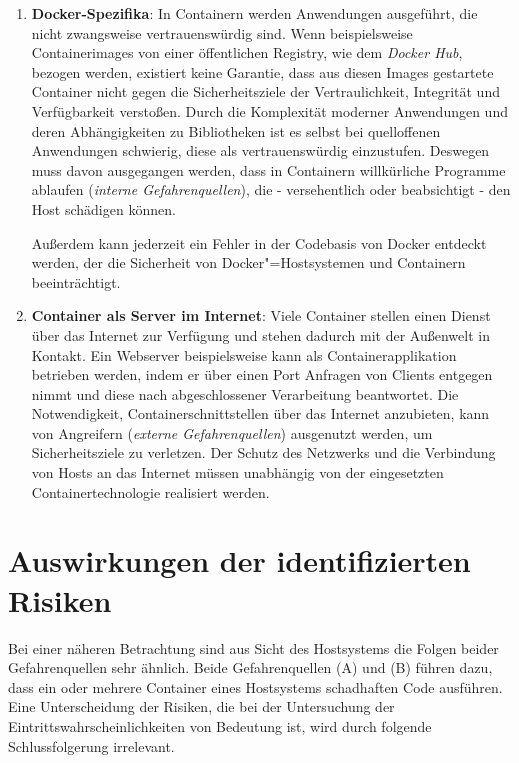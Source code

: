 \documentclass[../main.tex]{subfiles}
\begin{document}
    \begin{enumerate}[label=(\Alph*)]
      \item \textbf{Docker-Spezifika}: In Containern werden Anwendungen ausgeführt, die nicht zwangsweise vertrauenswürdig sind. Wenn beispielsweise Containerimages von einer öffentlichen Registry, wie dem \emph{Docker Hub}, bezogen werden, existiert keine Garantie, dass aus diesen Images gestartete Container nicht gegen die Sicherheitsziele der Vertraulichkeit, Integrität und Verfügbarkeit verstoßen. Durch die Komplexität moderner Anwendungen und deren Abhängigkeiten zu Bibliotheken ist es selbst bei quelloffenen Anwendungen schwierig, diese als vertrauenswürdig einzustufen. Deswegen muss davon ausgegangen werden, dass in Containern willkürliche Programme ablaufen (\emph{interne Gefahrenquellen}), die - versehentlich oder beabsichtigt - den Host schädigen können.

      Außerdem kann jederzeit ein Fehler in der Codebasis von Docker entdeckt werden, der die Sicherheit von Docker"=Hostsystemen und Containern beeinträchtigt.

      \item \textbf{Container als Server im Internet}: Viele Container stellen einen Dienst über das Internet zur Verfügung und stehen dadurch mit der Außenwelt in Kontakt. Ein Webserver beispielsweise kann als Containerapplikation betrieben werden, indem er über einen Port Anfragen von Clients entgegen nimmt und diese nach abgeschlossener Verarbeitung beantwortet. Die Notwendigkeit, Containerschnittstellen über das Internet anzubieten, kann von Angreifern (\emph{externe Gefahrenquellen}) ausgenutzt werden, um Sicherheitsziele zu verletzen. Der Schutz des Netzwerks und die Verbindung von Hosts an das Internet müssen unabhängig von der eingesetzten Containertechnologie realisiert werden.
    \end{enumerate}

  \section{Auswirkungen der identifizierten Risiken}
  \label{questionEffects}
    Bei einer näheren Betrachtung sind aus Sicht des Hostsystems die Folgen beider Gefahrenquellen sehr ähnlich. Beide Gefahrenquellen (A) und (B) führen dazu, dass ein oder mehrere Container eines Hostsystems schadhaften Code ausführen. Eine Unterscheidung der Risiken, die bei der Untersuchung der Eintrittswahrscheinlichkeiten von Bedeutung ist, wird durch folgende Schlussfolgerung irrelevant.
\end{document}
